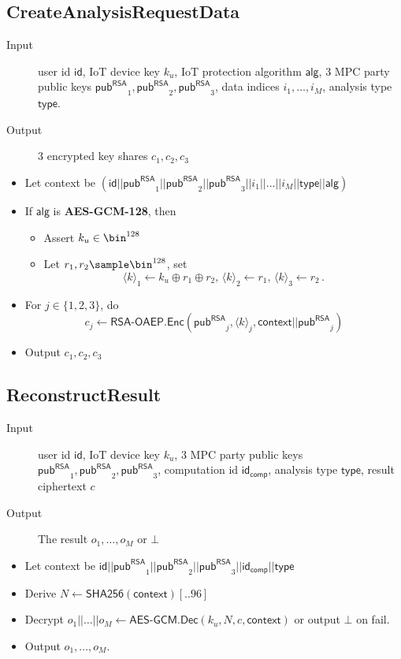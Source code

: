 \documentclass[10pt,a4paper]{article}
\newcommand{\pub}{\ensuremath{\mathsf{pub}}}
\newcommand{\pubRSA}{\ensuremath{\pub^{\mathsf{RSA}}}}
\newcommand{\id}{\ensuremath{\mathsf{id}}}
\newcommand{\idcomp}{\ensuremath{\mathsf{id}_{\mathsf{comp}}}}
\newcommand{\type}{\ensuremath{\mathsf{type}}}
\newcommand{\alg}{\ensuremath{\mathsf{alg}}}
\newcommand{\share}[1]{\ensuremath{\langle #1 \rangle}}
\newcommand{\AlgAESGCM}{\textsf{\textbf{AES-GCM-128}}}
\newcommand{\RSAOAEP}{\ensuremath{\textsf{RSA-OAEP}}}
\newcommand{\AESGCM}{\ensuremath{\textsf{AES-GCM}}}
\newcommand{\Encrypt}{\ensuremath{\textsf{Enc}}}
\newcommand{\Decrypt}{\ensuremath{\textsf{Dec}}}
\newcommand{\hash}{\ensuremath{\textsf{SHA256}}}
\begin{document}
\subsection{CreateAnalysisRequestData}
\begin{description}
	\item[Input] user id $\id$, IoT device key $k_u$, IoT protection algorithm $\alg$, 3 MPC party public keys $\pubRSA_1, \pubRSA_2, \pubRSA_3$, data indices $i_1, \dots, i_M$, analysis type $\type$.
	\item[Output] 3 encrypted key shares $c_1, c_2, c_3$
\end{description}
\begin{itemize}
	\item Let context be $(\id||\pubRSA_1||\pubRSA_2||\pubRSA_3||i_1||\dots||i_M||\type||\alg)$
	\item If $\alg$ is \AlgAESGCM, then
	\begin{itemize}
		\item Assert $k_u \in \bin^{128}$
		\item Let $r_1, r_2 \sample \bin^{128}$, set
		\[
			\share{k}_1 \gets k_u \oplus r_1 \oplus r_2,\, \share{k}_2 \gets r_1,\, \share{k}_3 \gets r_2 \,.
		\]
	\end{itemize}
	\item For $j \in \{1,2,3\}$, do
	\[
		c_j \gets \RSAOAEP.\Encrypt(\pubRSA_j, \share{k}_j, \mathsf{context}||\pubRSA_j)
	\]
	\item Output $c_1, c_2, c_3$
\end{itemize}

\subsection{ReconstructResult}
\begin{description}
	\item[Input] user id $\id$, IoT device key $k_u$, 3 MPC party public keys $\pubRSA_1, \pubRSA_2, \pubRSA_3$, computation id $\idcomp$, analysis type $\type$, result ciphertext $c$
	\item[Output] The result $o_1, \dots, o_M$ or $\bot$
\end{description}
\begin{itemize}
	\item Let context be $\id||\pubRSA_1||\pubRSA_2||\pubRSA_3||\idcomp||\type$
	\item Derive $N \gets \hash(\mathsf{context})[..96]$
	\item Decrypt $o_1||\dots||o_M \gets \AESGCM.\Decrypt(k_u,N,c,\mathsf{context})$ or output $\bot$ on fail.
	\item Output $o_1, \dots, o_M$.
\end{itemize}
\end{document}
